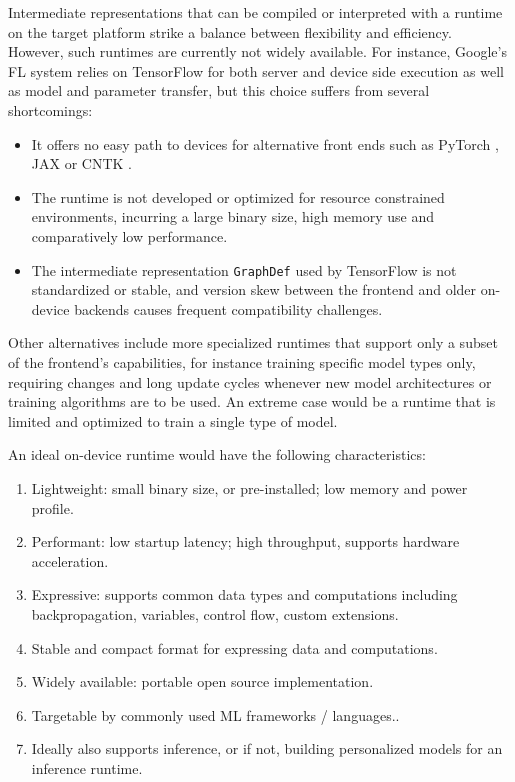 \documentclass[11pt]{article}
\begin{document}
Intermediate representations that can be compiled or interpreted with a runtime on the target platform strike a balance between flexibility and efficiency. However, such runtimes are currently not widely available. For instance, Google’s FL system \citep{bonawitz19sysml} relies on TensorFlow for both server and device side execution as well as model and parameter transfer, but this choice suffers from several shortcomings:
\begin{itemize}
    \item It offers no easy path to devices for alternative front ends such as PyTorch \citep{pytorch_NEURIPS2019_9015}, JAX \citep{jax2018github} or CNTK \citep{cntk}.
    \item The runtime is not developed or optimized for resource constrained environments, incurring a large binary size, high memory use and comparatively low performance.
    \item The intermediate representation \texttt{GraphDef} used by TensorFlow is not standardized or stable, and version skew between the frontend and older on-device backends causes frequent compatibility challenges.
\end{itemize}

Other alternatives include more specialized runtimes that support only a subset of the frontend’s capabilities, for instance training specific model types only, requiring changes and long update cycles whenever new model architectures or training algorithms are to be used. An extreme case would be a runtime that is limited and optimized to train a single type of model.

An ideal on-device runtime would have the following characteristics:
\begin{enumerate}
    \item Lightweight: small binary size, or pre-installed; low memory and power profile.
    \item Performant: low startup latency; high throughput, supports hardware acceleration.
    \item Expressive: supports common data types and computations including backpropagation, variables, control flow, custom extensions.
    \item Stable and compact format for expressing data and computations.
    \item Widely available: portable open source implementation.
    \item Targetable by commonly used ML frameworks / languages..
    \item Ideally also supports inference, or if not, building personalized models for an inference runtime.
\end{enumerate}
\end{document}
